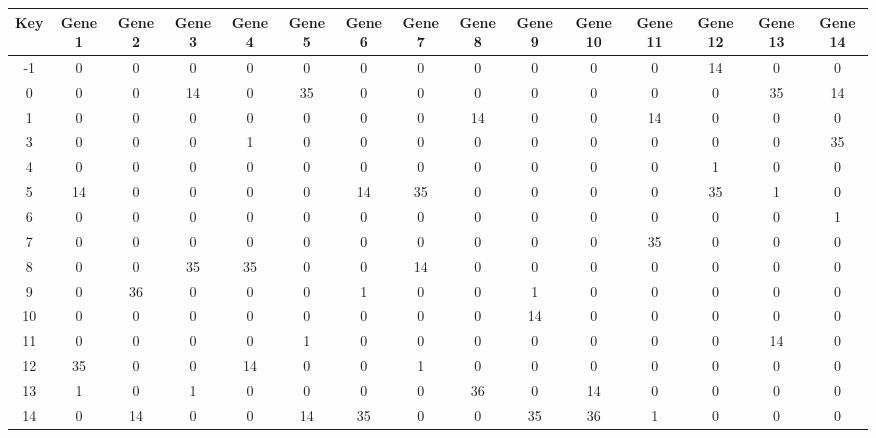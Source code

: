 \begin{tabular}{|c|c|c|c|c|c|c|c|c|c|c|c|c|c|c|}
\hline
Key & Gene 1 & Gene 2 & Gene 3 & Gene 4 & Gene 5 & Gene 6 & Gene 7 & Gene 8 & Gene 9 & Gene 10 & Gene 11 & Gene 12 & Gene 13 & Gene 14 \\
\hline
-1 & 0 & 0 & 0 & 0 & 0 & 0 & 0 & 0 & 0 & 0 & 0 & 14 & 0 & 0 \\
0 & 0 & 0 & 14 & 0 & 35 & 0 & 0 & 0 & 0 & 0 & 0 & 0 & 35 & 14 \\
1 & 0 & 0 & 0 & 0 & 0 & 0 & 0 & 14 & 0 & 0 & 14 & 0 & 0 & 0 \\
3 & 0 & 0 & 0 & 1 & 0 & 0 & 0 & 0 & 0 & 0 & 0 & 0 & 0 & 35 \\
4 & 0 & 0 & 0 & 0 & 0 & 0 & 0 & 0 & 0 & 0 & 0 & 1 & 0 & 0 \\
5 & 14 & 0 & 0 & 0 & 0 & 14 & 35 & 0 & 0 & 0 & 0 & 35 & 1 & 0 \\
6 & 0 & 0 & 0 & 0 & 0 & 0 & 0 & 0 & 0 & 0 & 0 & 0 & 0 & 1 \\
7 & 0 & 0 & 0 & 0 & 0 & 0 & 0 & 0 & 0 & 0 & 35 & 0 & 0 & 0 \\
8 & 0 & 0 & 35 & 35 & 0 & 0 & 14 & 0 & 0 & 0 & 0 & 0 & 0 & 0 \\
9 & 0 & 36 & 0 & 0 & 0 & 1 & 0 & 0 & 1 & 0 & 0 & 0 & 0 & 0 \\
10 & 0 & 0 & 0 & 0 & 0 & 0 & 0 & 0 & 14 & 0 & 0 & 0 & 0 & 0 \\
11 & 0 & 0 & 0 & 0 & 1 & 0 & 0 & 0 & 0 & 0 & 0 & 0 & 14 & 0 \\
12 & 35 & 0 & 0 & 14 & 0 & 0 & 1 & 0 & 0 & 0 & 0 & 0 & 0 & 0 \\
13 & 1 & 0 & 1 & 0 & 0 & 0 & 0 & 36 & 0 & 14 & 0 & 0 & 0 & 0 \\
14 & 0 & 14 & 0 & 0 & 14 & 35 & 0 & 0 & 35 & 36 & 1 & 0 & 0 & 0 \\
\hline
\end{tabular}